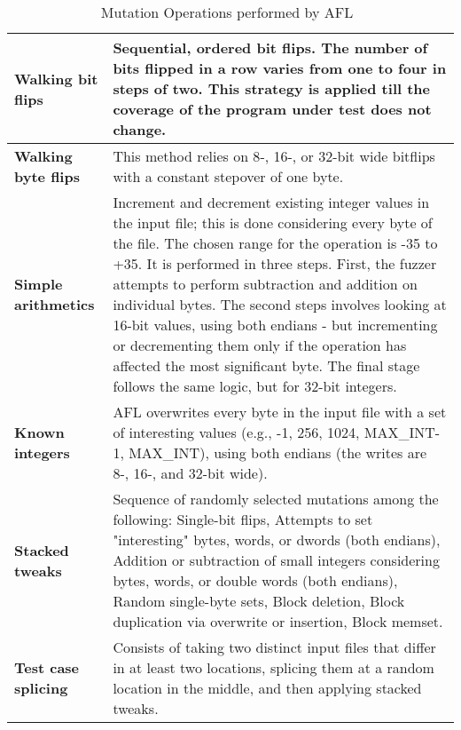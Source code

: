 
%


\begin{table}[h]
\caption{Mutation Operations performed by AFL~\cite{gutmann2016fuzzing}}
\label{table:AFL:operators}


\tiny
\begin{tabular}{|p{2.5cm}|p{10cm}|}

\hline

\textbf{Walking bit flips}& Sequential, ordered bit flips. The number of bits flipped in a row varies from one to four in steps of two. This strategy is applied till the coverage of the program under test does not change.\\

\hline
\textbf{Walking byte flips}& This method relies on 8-, 16-, or 32-bit wide bitflips with a constant stepover of one byte. \\

\hline
\textbf{Simple arithmetics}& Increment and decrement existing integer values in the input file; this is done considering every byte of the file. The chosen range for the operation is -35 to +35. It is performed in three steps. First, the fuzzer attempts to perform subtraction and addition on individual bytes. The second steps involves looking at 16-bit values, using both endians - but incrementing or decrementing them only if the operation has affected the most significant byte. The final stage follows the same logic, but for 32-bit integers.\\

\hline
\textbf{Known integers}& 
AFL overwrites every byte in the input file with a set of interesting values (e.g., -1, 256, 1024, MAX\_INT-1, MAX\_INT), using both endians (the writes are 8-, 16-, and 32-bit wide).\\

\hline
\textbf{Stacked tweaks}& Sequence of randomly selected mutations among the following: Single-bit flips, Attempts to set "interesting" bytes, words, or dwords (both endians), Addition or subtraction of small integers considering bytes, words, or double words (both endians), Random single-byte sets, Block deletion, Block duplication via overwrite or insertion, Block memset. \\

\hline
\textbf{Test case splicing}& Consists of taking two distinct input files that differ in at least two locations, splicing them at a random location in the middle, and then applying stacked tweaks.\\

\hline

\end{tabular}
\end{table}


